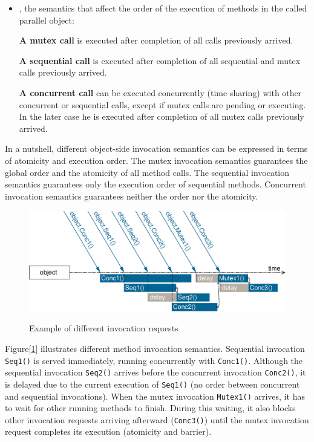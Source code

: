 \begin{itemize}
\item {}, the semantics that affect the order
 of the execution of methods in the called parallel object:

	\subitem \textbf{A mutex call} is executed after completion of all calls previously arrived.
	
	\subitem \textbf{A sequential call} is executed after completion of all sequential and
	mutex calls previously arrived.

	\subitem \textbf{A concurrent call} can be executed concurrently (time sharing) with other
	concurrent or sequential calls, except if mutex calls are pending or executing.
	In the later case he is executed after completion of all mutex calls previously
	arrived.

\end{itemize}

In a nutshell, different object-side invocation semantics can be
expressed in terms of atomicity and execution order. The mutex
invocation semantics guarantees the global order and the atomicity of
all method calls. The sequential invocation semantics guarantees only
the execution order of sequential methods. Concurrent invocation
semantics guarantees neither the order nor the atomicity.


\begin{figure}[ht]
	\caption{Example of different invocation requests}
  	\centering
	\includegraphics[scale=0.5]{fig_inv_semantics.eps}
	\label{fig_inv_semantics}
\end{figure}


Figure[\ref{fig_inv_semantics}] illustrates different method invocation
semantics. Sequential invocation \texttt{Seq1()} is served immediately,
running concurrently with \texttt{Conc1()}. Although the sequential
invocation \texttt{Seq2()} arrives before the concurrent invocation
\texttt{Conc2()}, it is delayed due to the current execution of
\texttt{Seq1()} (no order between concurrent and sequential invocations).
When the mutex invocation \texttt{Mutex1()} arrives, it has to wait for
other running methods to finish. During this waiting, it also blocks
other invocation requests arriving afterward (\texttt{Conc3()}) until
the mutex invocation request completes its execution (atomicity and
barrier).



